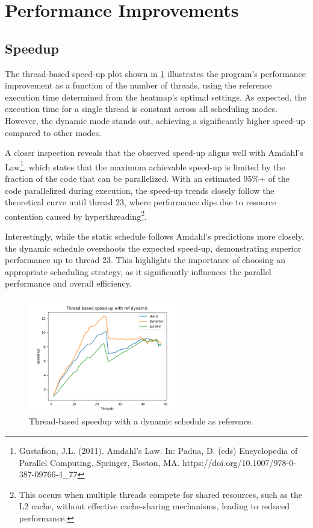 \documentclass[english,11pt]{article}
\begin{document}
\section{Performance Improvements}
\subsection{Speedup}
The thread-based speed-up plot shown in \ref{fig:speedup} illustrates the program's performance improvement as a function of the number of threads, using the reference execution time determined from the heatmap's optimal settings. As expected, the execution time for a single thread is constant across all scheduling modes. However, the dynamic mode stands out, achieving a significantly higher speed-up compared to other modes.

A closer inspection reveals that the observed speed-up aligns well with Amdahl's Law\footnote{Gustafson, J.L. (2011). Amdahl’s Law. In: Padua, D. (eds) Encyclopedia of Parallel Computing. Springer, Boston, MA. https://doi.org/10.1007/978-0-387-09766-4_77}, which states that the maximum achievable speed-up is limited by the fraction of the code that can be parallelized. With an estimated 95\%+ of the code parallelized during execution, the speed-up trends closely follow the theoretical curve until thread 23, where performance dips due to resource contention caused by hyperthreading\footnote{This occurs when multiple threads compete for shared resources, such as the L2 cache, without effective cache-sharing mechanisms, leading to reduced performance.}. 

Interestingly, while the static schedule follows Amdahl's predictions more closely, the dynamic schedule overshoots the expected speed-up, demonstrating superior performance up to thread 23. This highlights the importance of choosing an appropriate scheduling strategy, as it significantly influences the parallel performance and overall efficiency.

\begin{figure}[h!]
    \centering
    \includegraphics[width=0.6\textwidth]{graph/TB_SU_ref-dynamic.png}
    \caption{Thread-based speedup with a dynamic schedule as reference.}
    \label{fig:speedup}
\end{figure}
\end{document}

